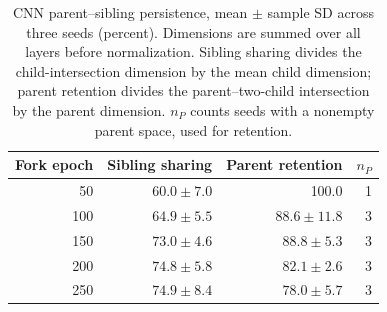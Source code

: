 \begin{table}[!htbp]\centering\small
\caption{CNN parent--sibling persistence, mean $\pm$ sample SD across three seeds (percent). Dimensions are summed over all layers before normalization. Sibling sharing divides the child-intersection dimension by the mean child dimension; parent retention divides the parent--two-child intersection by the parent dimension. $n_P$ counts seeds with a nonempty parent space, used for retention.}\label{tab:lmc-cnn-persistence}
\begin{tabular}{rrrr}\toprule
Fork epoch & Sibling sharing & Parent retention & $n_P$\\\midrule
50 & $60.0\pm7.0$ & 100.0 & 1 \\
100 & $64.9\pm5.5$ & $88.6\pm11.8$ & 3 \\
150 & $73.0\pm4.6$ & $88.8\pm5.3$ & 3 \\
200 & $74.8\pm5.8$ & $82.1\pm2.6$ & 3 \\
250 & $74.9\pm8.4$ & $78.0\pm5.7$ & 3 \\\bottomrule\end{tabular}\end{table}

